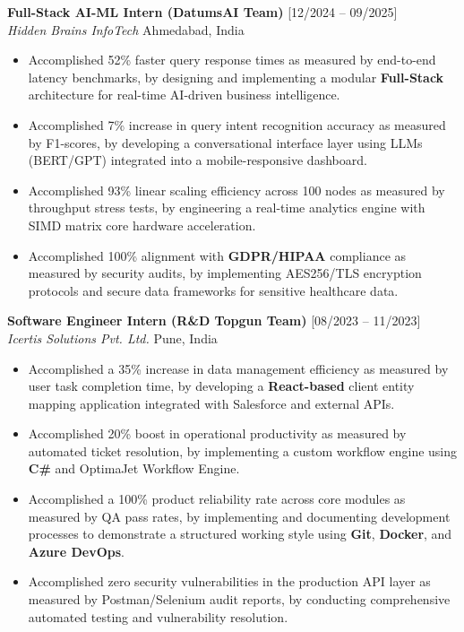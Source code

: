 \documentclass[10pt, a4paper]{article}
\begin{document}
\vspace{4pt}
\textbf{Full-Stack AI-ML Intern (DatumsAI Team)} \hfill [12/2024 – 09/2025] \\
\textit{Hidden Brains InfoTech} \hfill Ahmedabad, India
\begin{itemize}
    \item Accomplished 52\% faster query response times as measured by end-to-end latency benchmarks, by designing and implementing a modular \textbf{Full-Stack} architecture for real-time AI-driven business intelligence.
    \item Accomplished 7\% increase in query intent recognition accuracy as measured by F1-scores, by developing a conversational interface layer using LLMs (BERT/GPT) integrated into a mobile-responsive dashboard.
    \item Accomplished 93\% linear scaling efficiency across 100 nodes as measured by throughput stress tests, by engineering a real-time analytics engine with SIMD matrix core hardware acceleration.
    \item Accomplished 100\% alignment with \textbf{GDPR/HIPAA} compliance as measured by security audits, by implementing AES256/TLS encryption protocols and secure data frameworks for sensitive healthcare data.
\end{itemize}

\vspace{4pt}
\textbf{Software Engineer Intern (R\&D Topgun Team)} \hfill [08/2023 – 11/2023] \\
\textit{Icertis Solutions Pvt. Ltd.} \hfill Pune, India
\begin{itemize}
    \item Accomplished a 35\% increase in data management efficiency as measured by user task completion time, by developing a \textbf{React-based} client entity mapping application integrated with Salesforce and external APIs.
    \item Accomplished 20\% boost in operational productivity as measured by automated ticket resolution, by implementing a custom workflow engine using \textbf{C\#} and OptimaJet Workflow Engine.
    \item Accomplished a 100\% product reliability rate across core modules as measured by QA pass rates, by implementing and documenting development processes to demonstrate a structured working style using \textbf{Git}, \textbf{Docker}, and \textbf{Azure DevOps}.
    \item Accomplished zero security vulnerabilities in the production API layer as measured by Postman/Selenium audit reports, by conducting comprehensive automated testing and vulnerability resolution.
\end{itemize}
\end{document}
